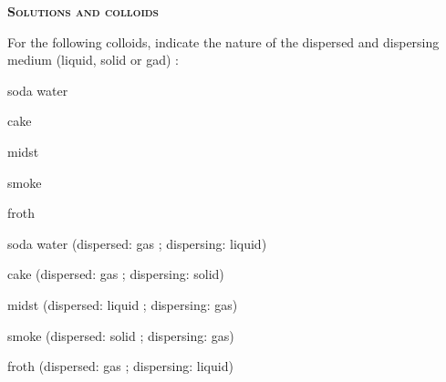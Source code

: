 \documentclass[main.tex]{subfiles}
\begin{document}
\newpage
\setdoublesep{0.35700 em}  %
\setatomsep{1.78500 em}    %
\setbondoffset{0.18265 em} %
\newcommand{\bondwidth}{0.06642 em} %
\setbondstyle{line width = \bondwidth}
\fancyhfoffset[E,O]{0pt}
\setlength{\columnsep}{30pt}
\begin{conclusion}
\end{conclusion}
\begin{multicols*}{2}\setcounter{numA}{1}



{\raggedright\textsc{\textbf{Solutions and colloids }}\par}
\begin{question}[ID=\the\value{numA}]
For the following colloids, indicate the nature of the dispersed and dispersing medium (liquid, solid or gad) : 
\begin{inparaenum}[(a)]	
\item  soda water %
\item  cake %
\item  midst %
\item  smoke %
\item  froth %
 \end{inparaenum}
\end{question}
\begin{solution}
\begin{inparaenum}[(a)]
\item  soda water   (dispersed: gas ; dispersing: liquid)
\item  cake   (dispersed: gas ; dispersing: solid)
\item  midst   (dispersed: liquid ; dispersing: gas)
\item  smoke   (dispersed: solid ; dispersing: gas)
\item  froth   (dispersed: gas ; dispersing: liquid)
 \end{inparaenum}
\hspace{0.1cm}\end{solution}%






\end{multicols*}
\end{document}
